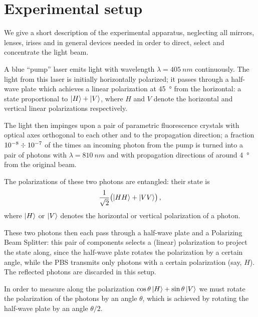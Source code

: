 \documentclass[main.tex]{subfiles}
\begin{document}
\section{Experimental setup}


We give a short description of the experimental apparatus, neglecting all mirrors, lenses, irises and in general devices needed in order to direct, select and concentrate the light beam.

A blue ``pump'' laser emits light with wavelength \(\lambda = \SI{405}{nm}\) continuously.
The light from this laser is initially horizontally polarized; it passes through a half-wave plate which achieves a linear polarization at \SI{45}{\degree} from the horizontal: a state proportional to \(\ket{H} + \ket{V}\), where \(H\) and \(V\) denote the horizontal and vertical linear polarizations respectively. 

The light then impinges upon a pair of parametric fluorescence crystals with optical axes orthogonal to each other and to the propagation direction;
a fraction \(\num{e-8}\divisionsymbol \num{e-7} \) of the times an incoming photon from the pump is turned into a pair of photons with \(\lambda = \SI{810}{nm}\) and with propagation directions of around \SI{4}{\degree} from the original beam. 

The polarizations of these two photons are entangled: their state is 
%
\begin{align} \label{eq:epr-state}
\frac{1}{\sqrt{2}} \qty(\ket{HH} + \ket{VV})
\,,
\end{align}
%
where \(\ket{H}\) or \(\ket{V}\) denotes the horizontal or vertical polarization of a photon. 

These two photons then each pass through a half-wave plate and a Polarizing Beam Splitter: this pair of components selects a (linear) polarization to project the state along, since the half-wave plate rotates the polarization by a certain angle, while the PBS transmits only photons with a certain polarization (say, \(H\)).
The reflected photons are discarded in this setup. 

In order to measure along the polarization \(\cos \theta \ket{H} + \sin \theta \ket{V}\) we must rotate the polarization of the photons by an angle \(\theta \), which is achieved by rotating the half-wave plate by an angle \(\theta /2\). 
\end{document}
